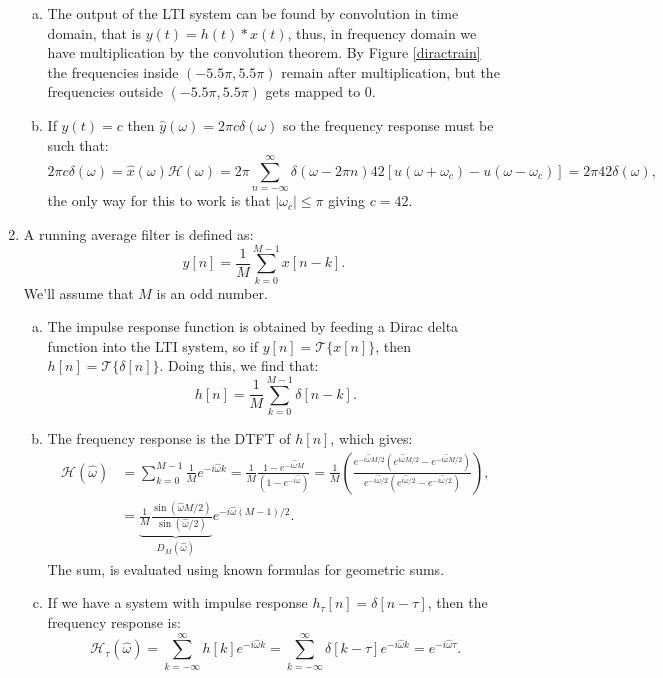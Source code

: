 \begin{enumerate}
\begin{enumerate}[a)]
\item The output of the LTI system can be found by convolution in time domain, that is $y(t)=h(t)*x(t)$, thus, 
in frequency domain we have multiplication by the convolution theorem. By Figure \ref{diractrain} the frequencies 
inside $(-5.5\pi,5.5\pi)$ remain after multiplication, but the frequencies outside $(-5.5\pi,5.5\pi)$ gets mapped to $0$. 

\item If $y(t)=c$ then $\hat{y}(\omega)=2\pi c\delta(\omega)$ so the frequency response must be such that:
$$2\pi c\delta(\omega)=\hat{x}(\omega)\mathcal{H}(\omega)=2\pi\sum_{n=-\infty}^{\infty}\delta(\omega-2\pi n)42[u(\omega+\omega_{c})-u(\omega-\omega_{c})]=2\pi42\delta(\omega),$$
the only way for this to work is that $|\omega_{c}|\le\pi$ giving $c=42$. 
\end{enumerate}

\item A running average filter is defined as:
$$y[n]=\frac{1}{M}\sum_{k=0}^{M-1}x[n-k].$$
We'll assume that $M$ is an odd number. 

\begin{enumerate}[a)]
\item The impulse response function is obtained by feeding a Dirac delta function into the LTI system, so if $y[n]=\mathcal{T}\{x[n]\}$, 
then $h[n]=\mathcal{T}\{\delta[n]\}$. Doing this, we find that:
$$h[n]=\frac{1}{M}\sum_{k=0}^{M-1}\delta[n-k].$$

\item The frequency response is the DTFT of $h[n]$, which gives:
\begin{align*}
    \mathcal{H}(\hat{\omega})&=\sum_{k=0}^{M-1}\frac{1}{M}e^{-i\hat{\omega}k}=\frac{1}{M}\frac{1-e^{-i\hat{\omega}M}}{(1-e^{-i\hat{\omega}})}
    =\frac{1}{M}\left(\frac{e^{-i\hat{\omega}M/2}(e^{i\hat{\omega}M/2}-e^{-i\hat{\omega}M/2})}{e^{-i\hat{\omega}/2}(e^{i\hat{\omega}/2}-e^{-i\hat{\omega}/2})}\right), \\
    &=\underbrace{\frac{1}{M}\frac{\sin(\hat{\omega}M/2)}{\sin(\hat{\omega}/2)}}_{D_{M}(\hat{\omega})}e^{-i\hat{\omega}(M-1)/2}.
\end{align*}
The sum, is evaluated using known formulas for geometric sums. 

\item If we have a system with impulse response $h_{\tau}[n]=\delta[n-\tau]$, then the frequency response is:
$$\mathcal{H}_{\tau}(\hat{\omega})=\sum_{k=-\infty}^{\infty}h[k]e^{-i\hat{\omega}k}=\sum_{k=-\infty}^{\infty}\delta[k-\tau]e^{-i\hat{\omega}k}=e^{-i\hat{\omega}\tau}.$$


\end{enumerate}
\end{enumerate}
